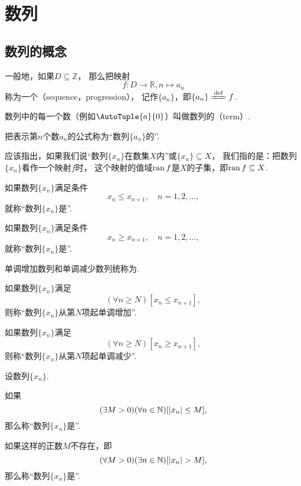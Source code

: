 \chapter{数列}
\section{数列的概念}
\begin{definition}\label{definition:数列.数列的定义}
一般地，如果\(D \subseteq \mathbb{Z}\)，
那么把映射\[
    f\colon D\to\mathbb{R}, n \mapsto a_n
\]称为一个（sequence，progression），
记作\(\{a_n\}\)，即\(\{a_n\} \defeq f\).

数列中的每一个数（例如\(\AutoTuple{a}{0}\)）叫做数列的（term）.

把表示第\(n\)个数\(a_n\)的公式称为“数列\(\{a_n\}\)的”.
\end{definition}

应该指出，如果我们说“数列\(\{x_n\}\)在数集\(X\)内”或\(\{x_n\} \subseteq X\)，
我们指的是：把数列\(\{x_n\}\)看作一个映射\(f\)时，
这个映射的值域\(\operatorname{ran} f\)是\(X\)的子集，即\(\operatorname{ran} f \subseteq X\).

\begin{definition}
如果数列\(\{x_n\}\)满足条件\[
	x_n \leq x_{n+1}, \quad n=1,2,\dotsc,
\]
就称“数列\(\{x_n\}\)是”.

如果数列\(\{x_n\}\)满足条件\[
	x_n \geq x_{n+1}, \quad n=1,2,\dotsc,
\]
就称“数列\(\{x_n\}\)是”.

单调增加数列和单调减少数列统称为.
\end{definition}

\begin{definition}
如果数列\(\{x_n\}\)满足\[
	(\forall n \geq N)[x_n \leq x_{n+1}],
\]
则称“数列\(\{x_n\}\)从第\(N\)项起单调增加”.

如果数列\(\{x_n\}\)满足\[
	(\forall n \geq N)[x_n \geq x_{n+1}],
\]
则称“数列\(\{x_n\}\)从第\(N\)项起单调减少”.
\end{definition}

\begin{definition}[数列的有界性]
设数列\(\{x_n\}\).

如果\[
	(\exists M>0)
	(\forall n\in\mathbb{N})
	[\abs{x_n} \leq M],
\]
那么称“数列\(\{x_n\}\)是”.

如果这样的正数\(M\)不存在，即\[
	(\forall M>0)
	(\exists n\in\mathbb{N})
	[\abs{x_n} > M],
\]
那么称“数列\(\{x_n\}\)是”.
\end{definition}

